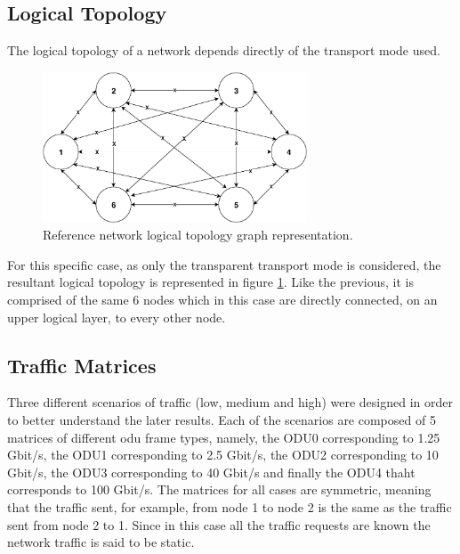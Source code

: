 \subsection{Logical Topology}

The logical topology of a network depends directly of the transport mode used.
\vspace{15pt}
\begin{figure}[H]
  \begin{center}
    \includegraphics[width=0.7\textwidth]{fig/logos/logicalTopologyReference.pdf}
    \caption{Reference network logical topology graph representation.}
  \end{center}
   \label{referenceLogical}
\end{figure}
\clearpage
For this specific case, as only the transparent transport mode is considered, the resultant logical topology is represented in figure \ref{referenceLogical}. Like the previous, it is comprised of the same 6 nodes which in this case are directly connected, on an upper logical layer, to every other node.

\subsection{Traffic Matrices}

Three different scenarios of traffic (low, medium and high) were designed in order to better understand the later results. Each of the scenarios are composed of 5 matrices of different \gls{odu} frame types, namely, the ODU0 corresponding to 1.25 Gbit/s, the ODU1 corresponding to 2.5 Gbit/s, the ODU2 corresponding to 10 Gbit/s, the ODU3 corresponding to 40 Gbit/s and finally the ODU4 thaht corresponds to 100 Gbit/s. The matrices for all cases are symmetric, meaning that the traffic sent, for example, from node 1 to node 2 is the same as the traffic sent from node 2 to 1. Since in this case all the traffic requests are known the network traffic is said to be static.

